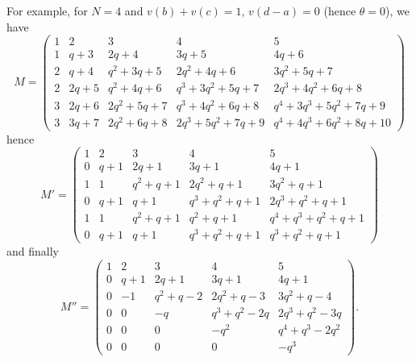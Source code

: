 \begin{example}
  For example, for $N = 4$ and $v(b)+v(c)=1$, $v(d-a) = 0$ (hence $\theta = 0$), we have
  \[
    M = \begin{pmatrix}
    1 & 2 & 3 & 4 & 5 \\
    1 & q + 3 & 2q + 4 & 3q + 5 & 4q + 6 \\
    2 & q + 4 & q^{2} + 3q + 5 & 2q^{2} + 4q + 6 & 3q^{2} + 5q + 7 \\
    2 & 2q + 5 & q^{2} + 4q + 6 & q^{3} + 3q^{2} + 5q + 7 & 2q^{3} + 4q^{2} + 6q + 8 \\
    3 & 2q + 6 & 2q^{2} + 5q + 7 & q^{3} + 4q^{2} + 6q + 8 & q^{4} + 3q^{3} + 5q^{2} + 7q + 9 \\
    3 & 3q + 7 & 2q^{2} + 6q + 8 & 2q^{3} + 5q^{2} + 7q + 9 & q^{4} + 4q^{3} + 6q^{2} + 8q + 10
    \end{pmatrix}
  \]
  hence
  \[ M'= \begin{pmatrix}
    1 & 2 & 3 & 4 & 5 \\
    0 & q + 1 & 2q + 1 & 3q + 1 & 4q + 1 \\
    1 & 1 & q^{2} + q + 1 & 2q^{2} + q + 1 & 3q^{2} + q + 1 \\
    0 & q + 1 & q + 1 & q^{3} + q^{2} + q + 1 & 2q^{3} + q^{2} + q + 1 \\
    1 & 1 & q^{2} + q + 1 & q^{2} + q + 1 & q^{4} + q^{3} + q^{2} + q + 1 \\
    0 & q + 1 & q + 1 & q^{3} + q^{2} + q + 1 & q^{3} + q^{2} + q + 1
    \end{pmatrix}
  \]
  and finally
  \[ M'' = \begin{pmatrix}
    1 & 2 & 3 & 4 & 5 \\
    0 & q + 1 & 2q + 1 & 3q + 1 & 4q + 1 \\
    0 & -1 & q^{2} + q - 2 & 2q^{2} + q - 3 & 3q^{2} + q - 4 \\
    0 & 0 & -q & q^{3} + q^{2} - 2q & 2q^{3} + q^{2} - 3q \\
    0 & 0 & 0 & -q^{2} & q^{4} + q^{3} - 2q^{2} \\
    0 & 0 & 0 & 0 & -q^{3}
    \end{pmatrix}. \]
\end{example}

